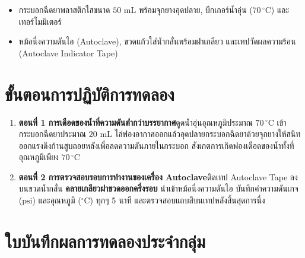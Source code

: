 \begin{equipbox}
\begin{itemize}
    \item กระบอกฉีดยาพลาสติกใสขนาด $50\text{ mL}$ พร้อมจุกยางอุดปลาย, บีกเกอร์น้ำอุ่น ($70\,^\circ\text{C}$) และเทอร์โมมิเตอร์
    \item หม้อนึ่งความดันไอ (Autoclave), ขวดแก้วใส่น้ำกลั่นพร้อมฝาเกลียว และเทปวัดผลความร้อน (Autoclave Indicator Tape)
\end{itemize}
\end{equipbox}

\section{ขั้นตอนการปฏิบัติการทดลอง}
\begin{enumerate}
    \item \textbf{ตอนที่ 1 การเดือดของน้ำที่ความดันต่ำกว่าบรรยากาศ}\quad ดูดน้ำอุ่นอุณหภูมิประมาณ $70\,^\circ\text{C}$ เข้ากระบอกฉีดยาประมาณ $20\text{ mL}$ ไล่ฟองอากาศออกแล้วอุดปลายกระบอกฉีดยาด้วยจุกยางให้สนิท ออกแรงดึงก้านสูบถอยหลังเพื่อลดความดันภายในกระบอก สังเกตการเกิดฟองเดือดของน้ำทั้งที่อุณหภูมิเพียง $70\,^\circ\text{C}$
    \item \textbf{ตอนที่ 2 การตรวจสอบรอบการทำงานของเครื่อง Autoclave}\quad ติดเทป Autoclave Tape ลงบนขวดน้ำกลั่น \textbf{คลายเกลียวฝาขวดออกครึ่งรอบ} นำเข้าหม้อนึ่งความดันไอ บันทึกค่าความดันเกจ ($\text{psi}$) และอุณหภูมิ ($^\circ\text{C}$) ทุกๆ 5 นาที และตรวจสอบแถบสีบนเทปหลังสิ้นสุดการนึ่ง
\end{enumerate}

\section{ใบบันทึกผลการทดลองประจำกลุ่ม}

